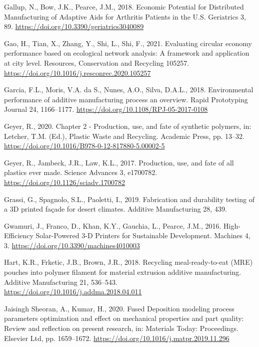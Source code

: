 \documentclass[
  12pt,
  number,
  review]{elsarticle}
\newlength{\cslhangindent}
\newlength{\cslentryspacingunit} %
\newenvironment{CSLReferences}[2] %
 {%
  \setlength{\parindent}{0pt}
  \ifodd #1
  \let\oldpar\par
  \def\par{\hangindent=\cslhangindent\oldpar}
  \fi
  \setlength{\parskip}{#2\cslentryspacingunit}
 }%
 {}
\begin{document}
\begin{CSLReferences}{1}{0}
\leavevmode{}%
Gallup, N., Bow, J.K., Pearce, J.M., 2018. Economic {Potential} for
{Distributed Manufacturing} of {Adaptive Aids} for {Arthritis Patients}
in the {U}.{S}. Geriatrics 3, 89.
\url{https://doi.org/10.3390/geriatrics3040089}

\leavevmode{}%
Gao, H., Tian, X., Zhang, Y., Shi, L., Shi, F., 2021. Evaluating
circular economy performance based on ecological network analysis: {A}
framework and application at city level. Resources, Conservation and
Recycling 105257. \url{https://doi.org/10.1016/j.resconrec.2020.105257}

\leavevmode{}%
Garcia, F.L., Moris, V.A. da S., Nunes, A.O., Silva, D.A.L., 2018.
Environmental performance of additive manufacturing process
\textendash{} an overview. Rapid Prototyping Journal 24, 1166--1177.
\url{https://doi.org/10.1108/RPJ-05-2017-0108}

\leavevmode{}%
Geyer, R., 2020. Chapter 2 - {Production}, use, and fate of synthetic
polymers, in: Letcher, T.M. (Ed.), Plastic {Waste} and {Recycling}.
{Academic Press}, pp. 13--32.
\url{https://doi.org/10.1016/B978-0-12-817880-5.00002-5}

\leavevmode{}%
Geyer, R., Jambeck, J.R., Law, K.L., 2017. Production, use, and fate of
all plastics ever made. Science Advances 3, e1700782.
\url{https://doi.org/10.1126/sciadv.1700782}

\leavevmode{}%
Grassi, G., Spagnolo, S.L., Paoletti, I., 2019. Fabrication and
durability testing of a {3D} printed façade for desert climates.
Additive Manufacturing 28, 439.

\leavevmode{}%
Gwamuri, J., Franco, D., Khan, K.Y., Gauchia, L., Pearce, J.M., 2016.
High-{Efficiency Solar-Powered} 3-{D Printers} for {Sustainable
Development}. Machines 4, 3.
\url{https://doi.org/10.3390/machines4010003}

\leavevmode{}%
Hart, K.R., Frketic, J.B., Brown, J.R., 2018. Recycling
meal-ready-to-eat ({MRE}) pouches into polymer filament for material
extrusion additive manufacturing. Additive Manufacturing 21, 536--543.
\url{https://doi.org/10.1016/j.addma.2018.04.011}

\leavevmode{}%
Jaisingh Sheoran, A., Kumar, H., 2020. Fused {Deposition} modeling
process parameters optimization and effect on mechanical properties and
part quality: {Review} and reflection on present research, in: Materials
{Today}: {Proceedings}. {Elsevier Ltd}, pp. 1659--1672.
\url{https://doi.org/10.1016/j.matpr.2019.11.296}


\end{CSLReferences}
\end{document}
